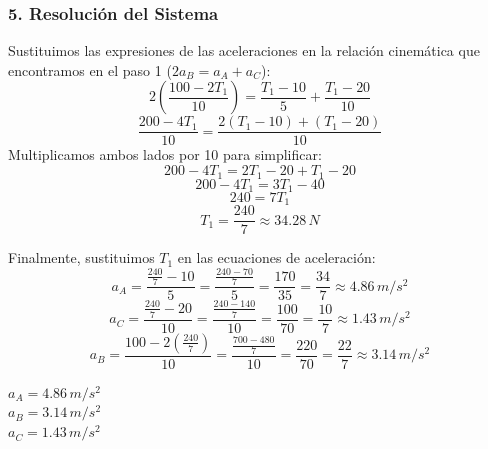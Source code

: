 \documentclass[12pt, a4paper]{article}
\begin{document}
\subsubsection*{5. Resolución del Sistema}
Sustituimos las expresiones de las aceleraciones en la relación cinemática que encontramos en el paso 1 ($2 a_B = a_A + a_C$):
$$ 2 \left( \frac{100 - 2 T_1}{10} \right) = \frac{T_1 - 10}{5} + \frac{T_1 - 20}{10} $$
$$ \frac{200 - 4 T_1}{10} = \frac{2(T_1 - 10) + (T_1 - 20)}{10} $$
Multiplicamos ambos lados por 10 para simplificar:
$$ 200 - 4 T_1 = 2 T_1 - 20 + T_1 - 20 $$
$$ 200 - 4 T_1 = 3 T_1 - 40 $$
$$ 240 = 7 T_1 $$
$$ T_1 = \frac{240}{7} \approx 34.28\,\si{N} $$

Finalmente, sustituimos $T_1$ en las ecuaciones de aceleración:
$$ a_A = \frac{\frac{240}{7} - 10}{5} = \frac{\frac{240 - 70}{7}}{5} = \frac{170}{35} = \frac{34}{7} \approx 4.86\,\si{m/s^2} $$
$$ a_C = \frac{\frac{240}{7} - 20}{10} = \frac{\frac{240 - 140}{7}}{10} = \frac{100}{70} = \frac{10}{7} \approx 1.43\,\si{m/s^2} $$
$$ a_B = \frac{100 - 2\left(\frac{240}{7}\right)}{10} = \frac{\frac{700 - 480}{7}}{10} = \frac{220}{70} = \frac{22}{7} \approx 3.14\,\si{m/s^2} $$

\begin{tcolorbox}[colback=green!5!white, colframe=green!50!black, title=Respuesta Final]
\centering
$a_A = 4.86\,\si{m/s^2}$ \\
$a_B = 3.14\,\si{m/s^2}$ \\
$a_C = 1.43\,\si{m/s^2}$
\end{tcolorbox}
\end{document}
